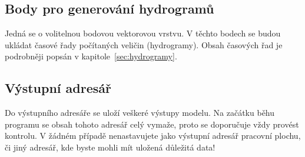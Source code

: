 












\subsection{Body pro generování hydrogramů} \label{sec:vstupbody}

Jedná  se o volitelnou bodovou vektorovou vrstvu. V těchto bodech se budou ukládat časové řady počítaných veličin (hydrogramy). Obsah časových řad je podrobněji popsán v kapitole~\ref{sec:hydrogramy}.











\subsection{Výstupní adresář} \label{sec:vstupadresar}
Do výstupního adresáře se uloží veškeré výstupy modelu. Na začátku běhu programu se obsah tohoto adresář celý vymaže, proto se doporučuje vždy provést kontrolu. V žádném případě nenastavujete jako výstupní adresář pracovní plochu, či jiný adresář, kde byste mohli mít uložená důležitá data!











% 
% 
% 
% 
% 








